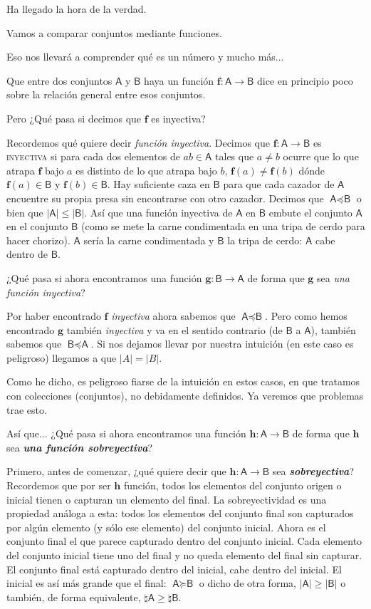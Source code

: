 \documentclass{amsart}
\theoremstyle{definition}
\theoremstyle{remark}
\numberwithin{equation}{section}
\newcommand{\abs}[1]{\left\lvert#1\right\rvert}
\newcommand{\fromto}{\longrightarrow}
\newcommand{\setsymbol}[1]{\textsf{#1}}
\newcommand{\sA}{\setsymbol{A}}
\newcommand{\sB}{\setsymbol{B}}
\newcommand{\card}[1]{\abs{#1}}
\newcommand{\numeral}{\natural}
\newcommand{\monrel}[1]{\mathbf{#1}}
\newcommand{\funct}[1]{\monrel{#1}}
\newcommand{\functat}[2]{\funct{#1}{\left({#2}\right)}}
\newcommand{\leqpot}{\preccurlyeq}
\newcommand{\geqpot}{\succcurlyeq}
\begin{document}
	Ha llegado la hora de la verdad. 
	
	
	Vamos a comparar conjuntos mediante funciones. 
	
	
	Eso nos llevará a comprender qué es un número y mucho más...
	
	
	Que entre dos conjuntos $\sA$ y $\sB$ haya un función $\funct{f}:\sA 
\fromto \sB$ dice en principio poco sobre la relación general entre esos 
conjuntos.
	
	
	Pero ¿Qué pasa si decimos que $\funct{f}$ es inyectiva?
	
	
	Recordemos qué quiere decir \emph{función inyectiva}. Decimos que 
$\funct{f} : \sA \fromto \sB$ es \textsc{inyectiva} si para cada dos 
elementos de $a b \in \sA$ tales que $a \neq b$ ocurre que lo que atrapa 
$\funct{f}$ bajo $a$ es distinto de lo que atrapa bajo $b$, $\functat{f}{a} 
\neq \functat{f}{b}$ dónde $\functat{f}{a} \in \sB$ y $\functat{f}{b} \in 
\sB$. Hay suficiente caza en $\sB$ para que cada cazador de $\sA$ encuentre 
su propia presa sin encontrarse con otro cazador. Decimos que $\sA \leqpot 
\sB$ o bien que $\card{\sA} \leq \card{\sB}$. Así que una función inyectiva 
de $\sA$ en $\sB$ embute el conjunto $\sA$ en el conjunto $\sB$ (como se mete 
la carne condimentada en una tripa de cerdo para hacer chorizo). $\sA$ sería 
la carne condimentada y $\sB$ la tripa de cerdo: $\sA$ cabe dentro de $\sB$.


	¿Qué pasa si ahora encontramos una función $\funct{g}:\sB\fromto\sA$ de 
forma que $\funct{g}$ sea \emph{una función inyectiva}?


	Por haber encontrado $\funct{f}$ \emph{inyectiva} ahora sabemos que 
$\sA\leqpot\sB$. Pero como hemos encontrado $\funct{g}$ también 
\emph{inyectiva} y va en el sentido contrario (de $\sB$ a $\sA$), también 
sabemos que $\sB \leqpot \sA$. Si nos dejamos llevar por nuestra intuición 
(en este caso es peligroso) llegamos a que $\card{A}=\card{B}$.


	Como he dicho, es peligroso fiarse de la intuición en estos casos, en que 
tratamos con colecciones (conjuntos), no debidamente definidos. Ya veremos 
que problemas trae esto.
	
	
	Así que... ¿Qué pasa si ahora encontramos una función 
$\funct{h}:\sA\fromto\sB$ de forma que $\funct{h}$ sea \textbf{\emph{una 
función sobreyectiva}}?
	
	
	Primero, antes de comenzar, ¿qué quiere decir que 
$\funct{h}:\sA\fromto\sB$ sea \textbf{\emph{sobreyectiva}}? Recordemos que 
por ser $\funct{h}$ función, todos los elementos del conjunto origen o 
inicial tienen o capturan un elemento del final. La sobreyectividad es una 
propiedad análoga a esta: todos los elementos del conjunto final son 
capturados por algún elemento (y sólo ese elemento) del conjunto inicial. 
Ahora es el conjunto final el que parece capturado dentro del conjunto 
inicial. Cada elemento del conjunto inicial tiene uno del final y no queda 
elemento del final sin capturar. El conjunto final está capturado dentro del 
inicial, cabe dentro del inicial. El inicial es así más grande que el final: 
$\sA \geqpot \sB$ o dicho de otra forma, $\card \sA \geq \card \sB$ o 
también, de forma equivalente, $\numeral \sA \geq \numeral \sB$.
\end{document}
